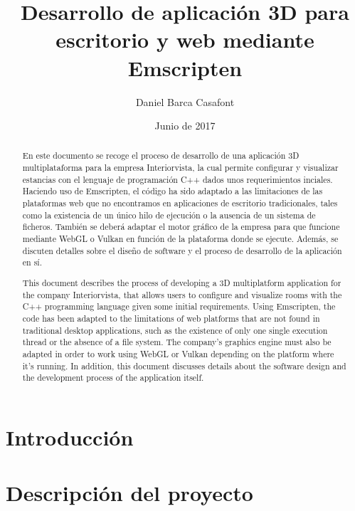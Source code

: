 \documentclass{report}
\title{Desarrollo de aplicación 3D para escritorio y web mediante Emscripten}
\author{Daniel Barca Casafont}
\date{Junio de 2017}
\begin{document}
\begin{titlepage}
\maketitle
\end{titlepage}

\cleardoublepage
\tableofcontents

\cleardoublepage
\begin{abstract}
En este documento se recoge el proceso de desarrollo de una aplicación 3D multiplataforma para la empresa Interiorvista, la cual permite configurar y visualizar estancias con el lenguaje de programación C++ dados unos requerimientos inciales. Haciendo uso de Emscripten, el código ha sido adaptado a las limitaciones de las plataformas web que no encontramos en aplicaciones de escritorio tradicionales, tales como la existencia de un único hilo de ejecución o la ausencia de un sistema de ficheros. También se deberá adaptar el motor gráfico de la empresa para que funcione mediante WebGL o Vulkan en función de la plataforma donde se ejecute. Además, se discuten detalles sobre el diseño de software y el proceso de desarrollo de la aplicación en sí.

This document describes the process of developing a 3D multiplatform application for the company Interiorvista, that allows users to configure and visualize rooms with the C++ programming language given some initial requirements. Using Emscripten, the code has been adapted to the limitations of web platforms that are not found in traditional desktop applications, such as the existence of only one single execution thread or the absence of a file system. The company's graphics engine must also be adapted in order to work using WebGL or Vulkan depending on the platform where it's running. In addition, this document discusses details about the software design and the development process of the application itself.
\end{abstract}

\cleardoublepage
{}

\chapter{Introducción}


\cleardoublepage
\chapter{Descripción del proyecto}

\end{document}
